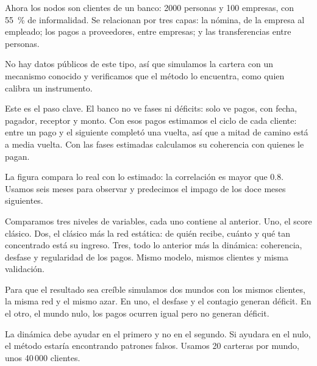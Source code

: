 \begin{decir}
Ahora los nodos son clientes de un banco: 2000 personas y 100 empresas, con 55~\% de
informalidad. Se relacionan por tres capas: la nómina, de la empresa al empleado; los
pagos a proveedores, entre empresas; y las transferencias entre personas.

No hay datos públicos de este tipo, así que simulamos la cartera con un mecanismo
conocido y verificamos que el método lo encuentra, como quien calibra un instrumento.
\end{decir}

\begin{decir}
Este es el paso clave. El banco no ve fases ni déficits: solo ve pagos, con fecha,
pagador, receptor y monto. Con esos pagos estimamos el ciclo de cada cliente: entre un
pago y el siguiente completó una vuelta, así que a mitad de camino está a media vuelta.
Con las fases estimadas calculamos su coherencia con quienes le pagan.

La figura compara lo real con lo estimado: la correlación es mayor que 0.8. Usamos seis
meses para observar y predecimos el impago de los doce meses siguientes.
\end{decir}

\begin{decir}
Comparamos tres niveles de variables, cada uno contiene al anterior. Uno, el score
clásico. Dos, el clásico más la red estática: de quién recibe, cuánto y qué tan
concentrado está su ingreso. Tres, todo lo anterior más la dinámica: coherencia, desfase
y regularidad de los pagos. Mismo modelo, mismos clientes y misma validación.
\end{decir}

\begin{decir}
Para que el resultado sea creíble simulamos dos mundos con los mismos clientes, la misma
red y el mismo azar. En uno, el desfase y el contagio generan déficit. En el otro, el
mundo nulo, los pagos ocurren igual pero no generan déficit.

La dinámica debe ayudar en el primero y no en el segundo. Si ayudara en el nulo, el
método estaría encontrando patrones falsos. Usamos 20 carteras por mundo, unos 40\,000
clientes.
\end{decir}

